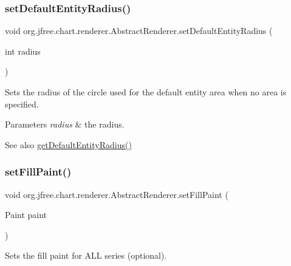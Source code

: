 \subsubsection{\texorpdfstring{set\+Default\+Entity\+Radius()}{setDefaultEntityRadius()}}
{\footnotesize\ttfamily void org.\+jfree.\+chart.\+renderer.\+Abstract\+Renderer.\+set\+Default\+Entity\+Radius (\begin{DoxyParamCaption}\item[{int}]{radius }\end{DoxyParamCaption})}

Sets the radius of the circle used for the default entity area when no area is specified.


\begin{DoxyParams}{Parameters}
{\em radius} & the radius.\\
\hline
\end{DoxyParams}
\begin{DoxySeeAlso}{See also}
\mbox{\hyperlink{classorg_1_1jfree_1_1chart_1_1renderer_1_1_abstract_renderer_aa9bc3e1d149543667cfbd109b19d7477}{get\+Default\+Entity\+Radius()}} 
\end{DoxySeeAlso}
\mbox{\label{classorg_1_1jfree_1_1chart_1_1renderer_1_1_abstract_renderer_af96e4cf14baee347449226a6648a4324}} 
\subsubsection{\texorpdfstring{set\+Fill\+Paint()}{setFillPaint()}\hspace{0.1cm}{\footnotesize\ttfamily [1/2]}}
{\footnotesize\ttfamily void org.\+jfree.\+chart.\+renderer.\+Abstract\+Renderer.\+set\+Fill\+Paint (\begin{DoxyParamCaption}\item[{Paint}]{paint }\end{DoxyParamCaption})}

Sets the fill paint for A\+LL series (optional).


